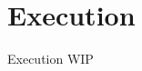 \documentclass[../../UsabilityReport.tex]{subfiles}
\begin{document}
\section{Execution}
	Execution WIP
\end{document}
